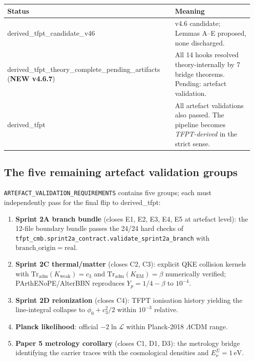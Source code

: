 \documentclass[11pt,a4paper]{article}
\begin{document}
\begin{center}
\renewcommand{\arraystretch}{1.18}
\begin{tabularx}{\textwidth}{@{}p{}Y@{}}
\toprule
\textbf{Status} & \textbf{Meaning} \\
\midrule
\textsf{derived\_tfpt\_candidate\_v46} &
v4.6 candidate; Lemmas A--E proposed, none discharged. \\
\textsf{derived\_tfpt\_theory\_complete\_\allowbreak{}pending\_artifacts}
\,(\textbf{NEW v4.6.7}) &
All 14 hooks resolved theory-internally by 7 bridge theorems.
Pending: artefact validation. \\
\textsf{derived\_tfpt} &
All artefact validations also passed. The pipeline becomes
\emph{TFPT-derived} in the strict sense. \\
\bottomrule
\end{tabularx}
\end{center}

\subsection{The five remaining artefact validation groups}

\texttt{ARTEFACT\_VALIDATION\_REQUIREMENTS} contains five groups; each
must independently pass for the final flip to \textsf{derived\_tfpt}:

\begin{enumerate}[leftmargin=1.4em]
\item \textbf{Sprint 2A branch bundle} (closes E1, E2, E3, E4, E5 at
artefact level): the 12-file boundary bundle passes the 24/24 hard
checks of \texttt{tfpt\_cmb.sprint2a\_contract.validate\_sprint2a\_branch}
with \(\mathrm{branch\_origin}=\mathrm{real}\).
\item \textbf{Sprint 2C thermal/matter} (closes C2, C3): explicit
QKE collision kernels with \(\mathrm{Tr}_{\mathrm{adm}}(K_{\mathrm{weak}})=c_3\)
and \(\mathrm{Tr}_{\mathrm{adm}}(K_{\mathrm{EM}})=\beta\) numerically
verified; PArthENoPE/AlterBBN reproduces \(Y_p=1/4-\beta\) to
\(10^{-4}\).
\item \textbf{Sprint 2D reionization} (closes C4): TFPT ionisation
history yielding the line-integral collapse to
\(\phi_0+c_3^2/2\) within \(10^{-3}\) relative.
\item \textbf{Planck likelihood}: official
\(-2\ln\mathcal L\) within Planck-2018 \(\Lambda\)CDM range.
\item \textbf{Paper 5 metrology corollary} (closes C1, D1, D3): the
metrology bridge identifying the carrier traces with the cosmological
densities and \(E_\nu^\Sigma=1\,\mathrm{eV}\).
\end{enumerate}
\end{document}
